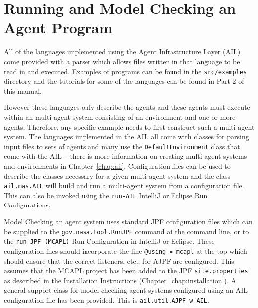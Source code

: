 \chapter{Running and Model Checking an Agent Program}
\label{chap:running}

All of the languages implemented using the Agent Infrastructure Layer (AIL) come provided with a parser which allows files written in that language to be read in and executed.  Examples of programs can be found in the \texttt{src/examples} directory and the tutorials for some of the languages can be found in Part 2 of this manual.

However these languages only describe the agents and these agents must execute within an multi-agent system consisting of an environment and one or more agents.  Therefore, any specific example needs to first construct such a multi-agent system.  The languages implemented in the AIL all come with classes for parsing input files to sets of agents and many use the \texttt{DefaultEnvironment} class that come with the AIL -- there is more information on creating multi-agent systems and environments in Chapter~\ref{chap:ail}. Configuration files can be used to describe the classes necessary  for a given multi-agent system and the class \texttt{ail.mas.AIL} will build and run a multi-agent system from a configuration file.  This can also be invoked using the \texttt{run-AIL} IntelliJ or Eclipse Run Configurations.

Model Checking an agent system uses standard JPF configuration files which can be supplied to the \texttt{gov.nasa.tool.RunJPF} command at the command line, or to the \texttt{run-JPF (MCAPL)} Run Configuration in IntelliJ or Eclipse.  These configuration files should incorporate the line \texttt{@using = mcapl} at the top which should ensure that the correct listeners, etc., for AJPF are configured.  This assumes that the MCAPL project has been added to the JPF \texttt{site.properties} as described in the Installation Instructions (Chapter~\ref{chap:installation}).  A general support class for model checking agent systems configured using an AIL configuration file has been provided.  This is \texttt{ail.util.AJPF\_w\_AIL}. 

